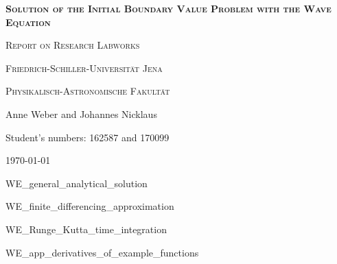 \documentclass[a4paper,headsepline,12pt,oneside]{scrartcl}
\begin{document}
\begin{titlepage}
	\centering

	{\scshape\Large \textbf{Solution of the Initial Boundary Value Problem with the Wave Equation} \par}
	\vspace{1cm}
	{\scshape\Large Report on Research Labworks \par}
	\vspace{1.5cm}
	{\huge\bfseries \par}
	\vspace{2cm}
	{\scshape\large Friedrich-Schiller-Universität Jena\par}
	{\scshape\large Physikalisch-Astronomische Fakultät\par}
	\vfill
	{\Large Anne Weber and Johannes Nicklaus\par}
	\vfill
	{Student's numbers: 162587 and 170099\par}

	\vfill

	{\large \today\par}
\end{titlepage}


\newpage
\setcounter{page}{0}
\tableofcontents
\clearpage
\setcounter{page}{1}

{WE_general_analytical_solution}

\clearpage

{WE_finite_differencing_approximation}


\clearpage

\clearpage
{WE_Runge_Kutta_time_integration}

\clearpage
\clearpage
\appendix
{WE_app_derivatives_of_example_functions}
\end{document}
